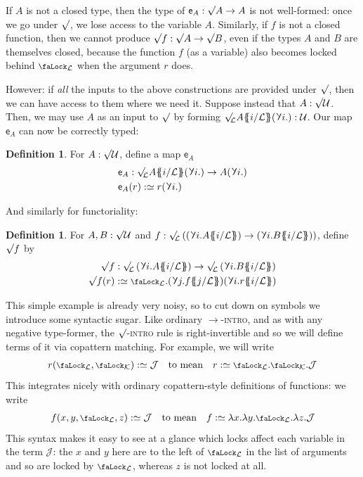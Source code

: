 \documentclass[10pt]{article}
\theoremstyle{definition}
\newtheorem{definition}[theorem]{Definition}
\let\oldequiv\equiv%
\renewcommand{\equiv}{\simeq}
\newcommand{\defeq}{\oldequiv}
\newcommand{\rulen}[1]{\textsc{#1}}
\newcommand{\judge}{\mathcal{J}}
\newcommand*{\univ}{\mathcal{U}}
\newcommand{\lock}{\mathchoice {\scalebox{0.8}{\text{\faLock}}}
  {\scalebox{0.8}{\text{\faLock}}} {\scalebox{0.5}{\text{\faLock}}}
  {\scalebox{0.4}{\text{\faLock}}} }
\newcommand{\rbindsym}{%
  \mathchoice
    {\reflectbox{\rotatebox[origin=c]{185}{$\lambda$}}}  %
    {\reflectbox{\rotatebox[origin=c]{185}{$\lambda$}}}  %
    {\reflectbox{\rotatebox[origin=c]{185}{$\scriptstyle\lambda$}}}  %
    {\reflectbox{\rotatebox[origin=c]{185}{$\scriptscriptstyle\lambda$}}}  %
  }
\newcommand{\rbind}[1]{\rbindsym{} #1.}
\newcommand{\lockn}[1]{\mathcal{#1}}
\newcommand{\ctxlocke}[1]{\lock_{#1}}
\newcommand{\ctxlock}[1]{\ctxlocke{\lockn{#1}}}
\newcommand{\stubra}[1]{\{\!\!\{ #1 \}\!\!\}}
\newcommand{\substuck}[2]{\stubra{#1/\lockn{#2}}}
\newcommand{\rformsym}{\surd}
\newcommand{\rforme}[2]{\ThisStyle{\raisebox{0.07em}{$\SavedStyle \rformsym_{\hspace{-0.25em}#1}$}} #2}
\newcommand{\rform}[2]{\rforme{\lockn{#1}}{#2}}
\newcommand{\rformu}[1]{\ThisStyle{\raisebox{0.07em}{$\SavedStyle \rformsym$}} #1}
\newcommand{\rintroe}[2]{\lock_{#1}. #2}
\newcommand{\rintro}[2]{\rintroe{\lockn{#1}}{#2}}
\newcommand{\relim}[1]{\rbindsym #1}
\newcommand{\extract}{\mathsf{e}}
\begin{document}
If $A$ is not a closed type, then the type of
$\extract_A : \rformu{A} \to A$ is not well-formed: once we go
under $\rformsym$, we lose access to the variable $A$. Similarly, if
$f$ is not a closed function, then we cannot produce
$\rformu f : \rformu A \to \rformu B$, even if the types $A$ and $B$
are themselves closed, because the function $f$ (as a variable) also
becomes locked behind $\ctxlock{L}$ when the argument $r$ does.

However: if \emph{all} the inputs to the above constructions are
provided under $\rformu$, then we can have access to them where we
need it. Suppose instead that $A : \rformu \univ$. Then, we may use
$A$ as an input to $\rformsym$ by forming
$\rform{L}{A\substuck{i}{L}(\rbind i)} : \univ$. Our map $\extract_A$
can now be correctly typed:

\begin{definition}
  For $A : \rformu \univ$, define a map $\extract_A$
  \begin{align*}
    &\extract_A : \rform{L}{A\substuck{i}{L}(\rbind i)} \to A(\rbind i) \\
    &\extract_A(r) :\defeq r(\rbind{i})
  \end{align*}  
\end{definition}

And similarly for functoriality:
\begin{definition}
  For $A,B : \rformu \univ$ and
  $f : \rform{L}\left((\relim{i.A\substuck{i}{L}}) \to (\relim{i.B\substuck{i}{L}})\right)$, define $\rformu f$ by
  \begin{align*}
    \rformu f &: \rform{L}\left(\relim{i.A\substuck{i}{L}}\right) \to \rform{L}\left( \relim{i.B\substuck{i}{L}}\right) \\
    \rformu f(r) &:\defeq \rintro{L}{(\relim{j. f\substuck{j}{L}})(\relim{i.r\substuck{i}{L}})}
  \end{align*}
\end{definition}

This simple example is already very noisy, so to cut down on symbols
we introduce some syntactic sugar. Like ordinary \rulen{$\to$-intro},
and as with any negative type-former, the \rulen{$\rformsym$-intro}
rule is right-invertible and so we will define terms of it via
copattern matching. For example, we will write
\begin{align*}
  r(\ctxlock{L}, \ctxlock{K}) :\defeq \judge
  \quad \text{to mean} \quad
  r :\defeq \rintro{L}{\rintro{K}{\judge}}
\end{align*}
This integrates nicely with ordinary copattern-style definitions of
functions: we write
\begin{align*}
  f(x,y,\ctxlock{L},z) :\defeq \judge
  \quad \text{to mean} \quad
  f :\defeq \lambda x. \lambda y. \rintro{L}{\lambda z. \judge}
\end{align*}
This syntax makes it easy to see at a glance which locks affect each
variable in the term $\judge$: the $x$ and $y$ here are to the left of
$\ctxlock{L}$ in the list of arguments and so are locked by
$\ctxlock{L}$, whereas $z$ is not locked at all.
\end{document}
